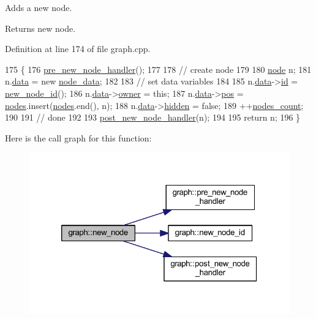 Adds a new node.

\begin{DoxyReturn}{Returns}
new node. 
\end{DoxyReturn}


Definition at line 174 of file graph.\+cpp.


\begin{DoxyCode}
175 \{
176     \mbox{\hyperlink{classgraph_afb7606eaa8d673b6599af24437c0546c}{pre\_new\_node\_handler}}();
177 
178     \textcolor{comment}{// create node}
179     
180     \mbox{\hyperlink{classnode}{node}} n;
181     n.\mbox{\hyperlink{classnode_a4ae3d54ebb61be3a102bedf5b91bef75}{data}} = \textcolor{keyword}{new} \mbox{\hyperlink{classnode__data}{node\_data}};
182 
183     \textcolor{comment}{// set data variables}
184 
185     n.\mbox{\hyperlink{classnode_a4ae3d54ebb61be3a102bedf5b91bef75}{data}}->\mbox{\hyperlink{classnode__data_ac87541ac4470e3c17df808ec9a67f6c4}{id}} = \mbox{\hyperlink{classgraph_a4c9af44fa03250994dd1dd972bd7cdfc}{new\_node\_id}}();
186     n.\mbox{\hyperlink{classnode_a4ae3d54ebb61be3a102bedf5b91bef75}{data}}->\mbox{\hyperlink{classnode__data_a20acb07c56fa28df6cbdbf3b0a02cb66}{owner}} = \textcolor{keyword}{this};
187     n.\mbox{\hyperlink{classnode_a4ae3d54ebb61be3a102bedf5b91bef75}{data}}->\mbox{\hyperlink{classnode__data_ab3deb00e39c12058e58a99a38507f344}{pos}} = \mbox{\hyperlink{classgraph_a4ea0592e8eb7c26c5abad24546907726}{nodes}}.insert(\mbox{\hyperlink{classgraph_a4ea0592e8eb7c26c5abad24546907726}{nodes}}.end(), n);
188     n.\mbox{\hyperlink{classnode_a4ae3d54ebb61be3a102bedf5b91bef75}{data}}->\mbox{\hyperlink{classnode__data_a0a841a84f5038562908d726392ce1b55}{hidden}} = \textcolor{keyword}{false};
189     ++\mbox{\hyperlink{classgraph_a1f59223d0bcf647920963d7a661dd74a}{nodes\_count}};
190 
191     \textcolor{comment}{// done}
192     
193     \mbox{\hyperlink{classgraph_acfe5bc8bdad9fa426750901144319e5f}{post\_new\_node\_handler}}(n);
194 
195     \textcolor{keywordflow}{return} n;
196 \}
\end{DoxyCode}
Here is the call graph for this function\+:
\nopagebreak
\begin{figure}[H]
\begin{center}
\leavevmode
\includegraphics[width=320pt]{classgraph_ab9505335c20558319b6cce25aed23524_cgraph}
\end{center}
\end{figure}
